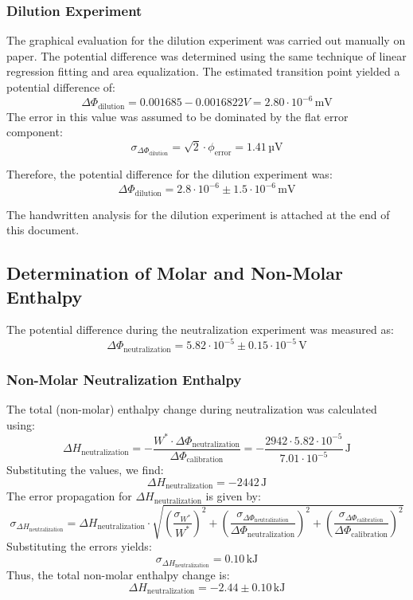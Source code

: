\documentclass[a4paper,12pt]{article}
\begin{document}
\subsubsection{Dilution Experiment}
The graphical evaluation for the dilution experiment was carried out manually on paper. The potential difference was determined using the same technique of linear regression fitting and area equalization. The estimated transition point yielded a potential difference of:
\[
\Delta \Phi_{\text{dilution}} = 0.001685 - 0.0016822 V = 2.80 \cdot 10^{-6} \, \text{mV}
\]
The error in this value was assumed to be dominated by the flat error component:
\[
\sigma_{\Delta \Phi_{\text{dilution}}} = \sqrt{2} \cdot \phi_{\text{error}} = 1.41 \, \text{µV}
\]

Therefore, the potential difference for the dilution experiment was:
\[
\Delta \Phi_{\text{dilution}} = 2.8 \cdot 10^{-6} \pm 1.5 \cdot 10^{-6} \, \text{mV}
\]

The handwritten analysis for the dilution experiment is attached at the end of this document.

\subsection{Determination of Molar and Non-Molar Enthalpy}

The potential difference during the neutralization experiment was measured as:
\[
\Delta \Phi_{\text{neutralization}} = 5.82 \cdot 10^{-5} \pm 0.15 \cdot 10^{-5} \, \text{V}
\]

\subsubsection{Non-Molar Neutralization Enthalpy}
The total (non-molar) enthalpy change during neutralization was calculated using:
\[
\Delta H_{\text{neutralization}} = -\frac{W^* \cdot \Delta \Phi_{\text{neutralization}}}{\Delta \Phi_{\text{calibration}}} = -\frac{2942 \cdot 5.82 \cdot 10^{-5}}{7.01 \cdot 10^{-5}} \, \si{\joule}
\]
Substituting the values, we find:
\[
\Delta H_{\text{neutralization}} = -2442 \, \si{\joule}
\]
The error propagation for \(\Delta H_{\text{neutralization}}\) is given by:
\[
\sigma_{\Delta H_{\text{neutralization}}} = \Delta H_{\text{neutralization}} \cdot \sqrt{\left(\frac{\sigma_{W^*}}{W^*}\right)^2 + \left(\frac{\sigma_{\Delta \Phi_{\text{neutralization}}}}{\Delta \Phi_{\text{neutralization}}}\right)^2 + \left(\frac{\sigma_{\Delta \Phi_{\text{calibration}}}}{\Delta \Phi_{\text{calibration}}}\right)^2}
\]
Substituting the errors yields:
\[
\sigma_{\Delta H_{\text{neutralization}}} = 0.10 \, \si{\kilo\joule}
\]
Thus, the total non-molar enthalpy change is:
\[
\Delta H_{\text{neutralization}} = -2.44 \pm 0.10 \,\si{\kilo\joule}
\]
\end{document}
